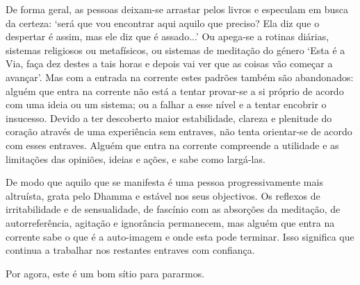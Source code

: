 De forma geral, as pessoas deixam-se arrastar pelos livros e especulam em busca da certeza: `será que vou encontrar aqui aquilo que preciso? Ela diz que o despertar é assim, mas ele diz que é assado...' Ou apega-se a rotinas diárias, sistemas religiosos ou metafísicos, ou sistemas de meditação do género `Esta é a Via, faça dez destes a tais horas e depois vai ver que as coisas vão começar a avançar'. Mas com a entrada na corrente estes padrões também são abandonados: alguém que entra na corrente não está a tentar provar-se a si próprio de acordo com uma ideia ou um sistema; ou a falhar a esse nível e a tentar encobrir o insucesso. Devido a ter descoberto maior estabilidade, clareza e plenitude do coração através de uma experiência sem entraves, não tenta orientar-se de acordo com esses entraves. Alguém que entra na corrente compreende a utilidade e as limitações das opiniões, ideias e ações, e sabe como largá-las.

De modo que aquilo que se manifesta é uma pessoa progressivamente mais altruísta, grata pelo Dhamma e estável nos seus objectivos. Os reflexos de irritabilidade e de sensualidade, de fascínio com as absorções da meditação, de autorreferência, agitação e ignorância permanecem, mas alguém que entra na corrente sabe o que é a auto-imagem e onde esta pode terminar. Isso significa que continua a trabalhar nos restantes entraves com confiança.

Por agora, este é um bom sítio para pararmos.
